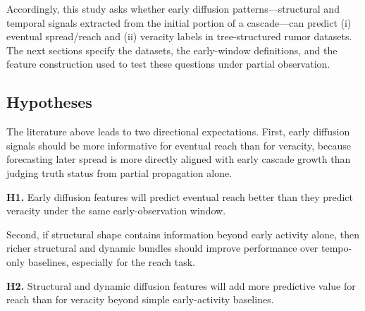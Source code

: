 Accordingly, this study asks whether early diffusion patterns---structural and temporal signals extracted from the initial portion of a cascade---can predict (i) eventual spread/reach and (ii) veracity labels in tree-structured rumor datasets. The next sections specify the datasets, the early-window definitions, and the feature construction used to test these questions under partial observation.

\subsection{Hypotheses}
The literature above leads to two directional expectations. First, early diffusion signals should be more informative for eventual reach than for veracity, because forecasting later spread is more directly aligned with early cascade growth than judging truth status from partial propagation alone.

\textbf{H1.} Early diffusion features will predict eventual reach better than they predict veracity under the same early-observation window.

Second, if structural shape contains information beyond early activity alone, then richer structural and dynamic bundles should improve performance over tempo-only baselines, especially for the reach task.

\textbf{H2.} Structural and dynamic diffusion features will add more predictive value for reach than for veracity beyond simple early-activity baselines.
